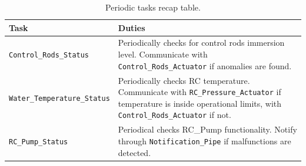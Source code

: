 \documentclass[10pt,a4paper]{report}
\begin{document}
\begin{table}[htb]
\centering 
\begin{tabular}{|l p{7cm}|}
\hline 
\textbf{Task} & \textbf{Duties} \\
\hline \hline
\texttt{Control\_Rods\_Status} & Periodically checks for control rods immersion 
    level. Communicate with \texttt{Control\_Rods\_Actuator} if anomalies are found.\\
\texttt{Water\_Temperature\_Status} & Periodically checks RC temperature. 
    Communicate with \texttt{RC\_Pressure\_Actuator} if temperature is inside 
    operational limits, with \texttt{Control\_Rods\_Actuator} if not.\\
\texttt{RC\_Pump\_Status} & Periodical checks RC\_Pump functionality. Notify
    through \texttt{Notification\_Pipe} if malfunctions are detected.\\
\hline
\end{tabular}
\caption{Periodic tasks recap table.}
\label{periodicrecap}
\end{table}

\end{document}
